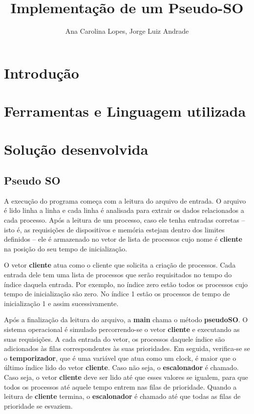 \documentclass[a4paper]{article}
\title{Implementação de um Pseudo-SO}
\author{Ana Carolina Lopes, Jorge Luiz Andrade}
\date{}
\begin{document}
\maketitle

\section{Introdução}

\section{Ferramentas e Linguagem utilizada}

\section{Solução desenvolvida}
\subsection{Pseudo SO}
A execução do programa começa com a leitura do arquivo de entrada. O arquivo é lido linha a linha e cada linha é analisada para extrair os dados relacionados a cada processo. Após a leitura de um processo, caso ele tenha entradas corretas -- isto é, as requisições de dispositivos e memória estejam dentro dos limites definidos -- ele é armazenado no vetor de lista de processos cujo nome é \textbf{cliente} na posição do seu tempo de inicialização.

O vetor \textbf{cliente} atua como o cliente que solicita a criação de processos. Cada entrada dele tem uma lista de processos que serão requisitados no tempo do índice daquela entrada. Por exemplo, no índice zero estão todos os processos cujo tempo de inicialização são zero. No índice 1 estão os processos de tempo de inicialização 1 e assim sucessivamente.

Após a finalização da leitura do arquivo, a \textbf{main} chama o método \textbf{pseudoSO}.
O sistema operacional é simulado percorrendo-se o vetor \textbf{cliente} e executando as suas requisições. A cada entrada do vetor, os processos daquele índice são adicionados às filas correspondentes às suas prioridades. 
Em seguida, verifica-se se o \textbf{temporizador}, que é uma variável que atua como um clock, é maior que o último índice lido do vetor \textbf{cliente}. Caso não seja, o \textbf{escalonador} é chamado. Caso seja, o vetor \textbf{cliente} deve ser lido até que esses valores se igualem, para que todos os processos até aquele tempo entrem nas filas de prioridade. Quando a leitura de \textbf{cliente} termina, o \textbf{escalonador} é chamado até que todas as filas de prioridade se esvaziem.
\end{document}
